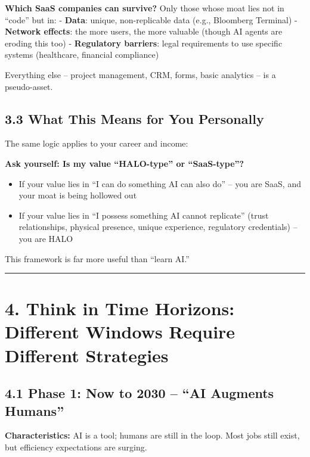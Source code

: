 \textbf{Which SaaS companies can survive?} Only those whose moat lies
not in ``code'' but in: - \textbf{Data}: unique, non-replicable data
(e.g., Bloomberg Terminal) - \textbf{Network effects}: the more users,
the more valuable (though AI agents are eroding this too) -
\textbf{Regulatory barriers}: legal requirements to use specific systems
(healthcare, financial compliance)

Everything else -- project management, CRM, forms, basic analytics -- is
a pseudo-asset.

\subsection{3.3 What This Means for You
Personally}\label{what-this-means-for-you-personally}

The same logic applies to your career and income:

\textbf{Ask yourself: Is my value ``HALO-type'' or ``SaaS-type''?}

\begin{itemize}
\tightlist
\item
  If your value lies in ``I can do something AI can also do'' -- you are
  SaaS, and your moat is being hollowed out
\item
  If your value lies in ``I possess something AI cannot replicate''
  (trust relationships, physical presence, unique experience, regulatory
  credentials) -- you are HALO
\end{itemize}

This framework is far more useful than ``learn AI.''

\begin{center}\rule{0.5\linewidth}{0.5pt}\end{center}

\section{4. Think in Time Horizons: Different Windows Require Different
Strategies}\label{think-in-time-horizons-different-windows-require-different-strategies}

\subsection{4.1 Phase 1: Now to 2030 -- ``AI Augments
Humans''}\label{phase-1-now-to-2030-ai-augments-humans}

\textbf{Characteristics:} AI is a tool; humans are still in the loop.
Most jobs still exist, but efficiency expectations are surging.

